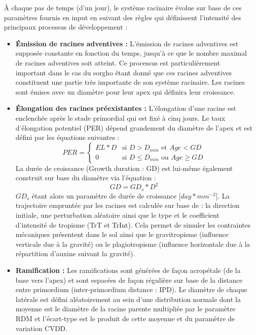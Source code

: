 À chaque pas de temps (d'un jour), le système racinaire évolue sur base de ces paramètres fournis en input en suivant des règles qui définissent l'intensité des principaux processus de développement :

\begin{itemize}
    \item \textbf{Émission de racines adventives :} 
    L'émission de racines adventives est supposée constante en fonction du temps, jusqu'à ce que le nombre maximal de racines adventives soit atteint.
    Ce processus est particulièrement important dans le cas du sorgho étant donné que ces racines adventives constituent une partie très importante de son système racinaire.
    Les racines sont émises avec un diamètre pour leur apex qui définira leur croissance.
    \item \textbf{Élongation des racines préexistantes :}
    L'élongation d'une racine est enclenchée après le stade primordial qui est fixé à cinq jours.
    Le taux d'élongation potentiel (PER) dépend grandement du diamètre de l'apex et est défini par les équations suivantes :
    \begin{equation}
    PER = 
    \begin{cases}
    EL*D & \text{si } D>D_{min} \text{ et } Age < GD \\
    0 & \text{si } D \leq D_{min} \text{ ou } Age \geq GD
    \end{cases}
    \label{eq:PER}
    \end{equation}
    La durée de croissance (Growth duration : GD) est lui-même également construit sur base du diamètre via l'équation :
    \begin{equation} GD=GD_s*D^2 \end{equation}
    $GD_s$ étant alors un paramètre de durée de croissance [$day*mm^{-2}$].
    La trajectoire empruntée par les racines est calculée sur base de : la direction initiale, une perturbation aléatoire ainsi que le type et le coefficient d'intensité de tropisme (TrT et TrInt).
    Cela permet de simuler les contraintes mécaniques présentent dans le sol ainsi que le gravitropisme (influence verticale due à la gravité) ou le plagiotropisme (influence horizontale due à la répartition d'auxine suivant la gravité).
    \item \textbf{Ramification :} 
    Les ramifications sont générées de façon acropétale (de la base vers l'apex) et sont espacées de façon régulière sur base de la distance entre primordium (inter-primordium distance : IPD).
    Le diamètre de chaque latérale est défini aléatoirement au sein d'une distribution normale dont la moyenne est le diamètre de la racine parente multipliée par le paramètre RDM et l'écart-type est le produit de cette moyenne et du paramètre de variation CVDD.

\end{itemize}
